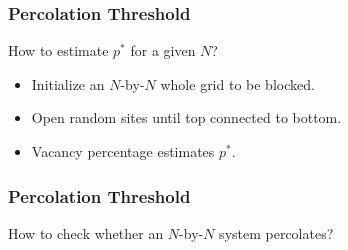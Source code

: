 \documentclass{beamer}
\begin{document}
\begin{frame}%
\frametitle{Percolation Threshold}

How to estimate $p^*$ for a given $N$?

\vspace{0.2cm}

\begin{itemize}

\item<2-> Initialize an $N$-by-$N$ whole grid to be blocked.

\vspace{0.2cm}

\item<3-> Open random sites until top connected to bottom.

\vspace{0.2cm}

\item<4-> Vacancy percentage estimates $p^*$.

\end{itemize}

\end{frame}

\begin{frame}%
\frametitle{Percolation Threshold}
How to check whether an $N$-by-$N$ system percolates?

\end{frame}
\end{document}
